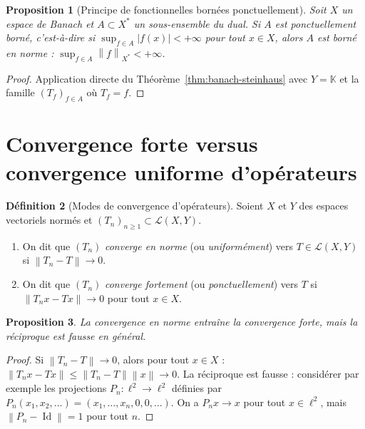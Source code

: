 \documentclass[a4paper,12pt]{book}
\DeclareMathOperator{\Id}{Id}
\newcommand{\K}{\mathbb{K}}
\newcommand{\norm}[1]{\left\| #1 \right\|}
\newcommand{\abs}[1]{\left| #1 \right|}
\theoremstyle{definition}
\newtheorem{definition}{Définition}[chapter]
\theoremstyle{plain}
\newtheorem{proposition}[definition]{Proposition}
\theoremstyle{remark}
\begin{document}
\begin{proposition}[Principe de fonctionnelles bornées ponctuellement]
\label{prop:fonctionnelles-bornees}
Soit $X$ un espace de Banach et $A \subset X^*$ un sous-ensemble du dual.
Si $A$ est ponctuellement borné,
c'est-à-dire si $\sup_{f \in A} \abs{f(x)} < +\infty$ pour tout $x \in X$,
alors $A$ est borné en norme : $\sup_{f \in A} \norm{f}_{X^*} < +\infty$.
\end{proposition}

\begin{proof}
Application directe du Théorème~\ref{thm:banach-steinhaus} avec
$Y = \K$ et la famille $(T_f)_{f \in A}$ où $T_f = f$.
\end{proof}


\section{Convergence forte versus convergence uniforme d'opérateurs}
\label{sec:convergence-operateurs}


\begin{definition}[Modes de convergence d'opérateurs]
\label{def:modes-convergence-op}
Soient $X$ et $Y$ des espaces vectoriels normés et $(T_n)_{n \geq 1} \subset \mathcal{L}(X,Y)$.
\begin{enumerate}[label=(\roman*)]
  \item On dit que $(T_n)$ \emph{converge en norme}
    (ou \emph{uniformément}) vers $T \in \mathcal{L}(X,Y)$ si $\norm{T_n - T} \to 0$.
  \item On dit que $(T_n)$ \emph{converge fortement}
    (ou \emph{ponctuellement}) vers $T$ si $\norm{T_n x - Tx} \to 0$ pour tout $x \in X$.
\end{enumerate}
\end{definition}

\begin{proposition}
\label{prop:uniform-implies-strong}
La convergence en norme entraîne la convergence forte, mais la réciproque
est fausse en général.
\end{proposition}

\begin{proof}
Si $\norm{T_n - T} \to 0$, alors pour tout $x \in X$ :
$\norm{T_n x - Tx} \leq \norm{T_n - T} \norm{x} \to 0$.
La réciproque est fausse : considérer par exemple les projections
$P_n : \ell^2 \to \ell^2$ définies par $P_n(x_1, x_2, \ldots) = (x_1, \ldots, x_n, 0, 0, \ldots)$.
On a $P_n x \to x$ pour tout $x \in \ell^2$, mais $\norm{P_n - \Id} = 1$ pour tout $n$.
\end{proof}
\end{document}
